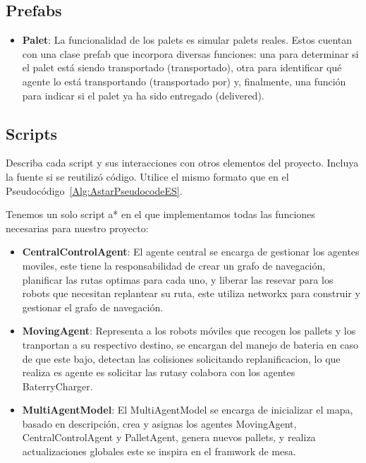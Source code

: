 \documentclass[sjournal]{IEEEtran}
\begin{document}
\subsection{Prefabs}
\begin{itemize}
\item \textbf{Palet}: La funcionalidad de los palets es simular palets reales. Estos cuentan con una clase prefab que incorpora diversas funciones: una para determinar si el palet está siendo transportado (transportado), otra para identificar qué agente lo está transportando (transportado por) y, finalmente, una función para indicar si el palet ya ha sido entregado (delivered).
\end{itemize}

\subsection{Scripts}
Describa cada script y sus interacciones con otros elementos del proyecto. Incluya la fuente si se reutilizó código. Utilice el mismo formato que en el Pseudocódigo~\ref{Alg:AstarPseudocodeES}.

Tenemos un solo script a* en el que implementamos todas las funciones necesarias para nuestro proyecto:

\begin{itemize}
\item \textbf{CentralControlAgent}: El agente central se encarga de gestionar los agentes moviles, este tiene la responsabilidad de crear un grafo de navegación, planificar las rutas optimas para cada uno, y liberar las resevar para los robots que necesitan replantear su ruta, este utiliza networkx para construir y gestionar el grafo de navegación.
\end{itemize}

\begin{itemize}
\item \textbf{MovingAgent}: Representa a los robots móviles que recogen los pallets y los tranportan a su respectivo destino, se encargan del manejo de bateria en caso de que este bajo, detectan las colisiones solicitando replanificacion, lo que realiza es agente es solicitar las rutasy colabora con los agentes BaterryCharger.
\end{itemize}

\begin{itemize}
\item \textbf{MultiAgentModel}: El MultiAgentModel se encarga de inicializar el mapa, basado en descripción, crea y asignas los agentes MovingAgent, CentralControlAgent y PalletAgent, genera nuevos pallets, y realiza actualizaciones globales este se inspira en el framwork de mesa.
\end{itemize}
\end{document}
